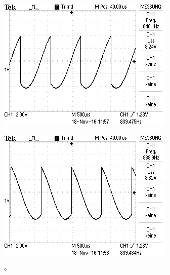 \begin{figure}[!h]
\begin{minipage}[t]{0.3\textwidth}
  \end{minipage}
  \hspace{12pt}
  \vspace{5pt}
  \begin{minipage}[t]{0.3\textwidth}
    \includegraphics[width=\textwidth]{Bilder/225.jpeg}
    \label{fig:105}
    \caption{\si{\degree}}
  \end{minipage}
  \hspace{12pt}
  \vspace{5pt}
  \begin{minipage}[t]{0.3\textwidth}
    \includegraphics[width=\textwidth]{Bilder/330.jpeg}
    \label{fig:330}
    \caption{\si{\degree}}
  \end{minipage}
  \hspace{12pt}
  \vspace{5pt}
\end{figure}
